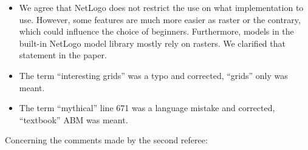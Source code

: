 \documentclass[11pt,a4paper,sans]{moderncv}        %
\begin{document}
\begin{itemize}
	\item We agree that NetLogo does not restrict the use on what implementation to use. However, some features are much more easier as raster or the contrary, which could influence the choice of beginners. Furthermore, models in the built-in NetLogo model library mostly rely on rasters. We clarified that statement in the paper.
	
	\item The term ``interesting grids'' was a typo and corrected, ``grids'' only was meant.
	
	\item The term ``mythical'' line 671 was a language mistake and corrected, ``textbook'' ABM was meant.
\end{itemize}




Concerning the comments made by the second referee:


\end{document}
